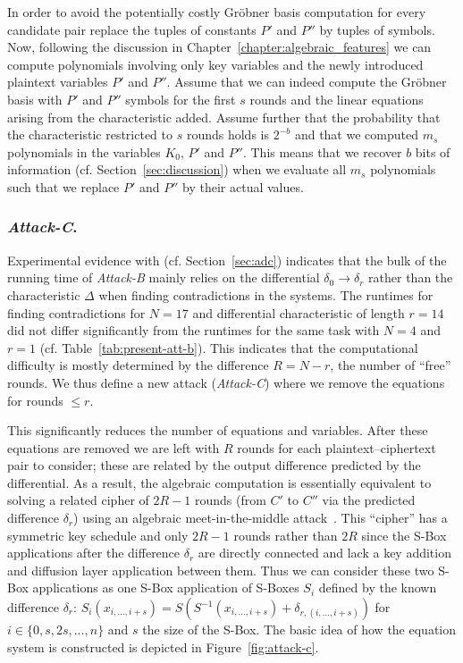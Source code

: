 In order to avoid the potentially costly Gröbner basis computation for every candidate pair replace the tuples of constants $P'$ and $P''$ by tuples of symbols. Now, following the discussion in Chapter~\ref{chapter:algebraic_features} we can compute polynomials involving only key variables and the newly introduced plaintext variables $P'$ and $P''$. Assume that we can indeed compute the Gröbner basis with $P'$ and $P''$ symbols for the first $s$ rounds and the linear equations arising from the characteristic added. Assume further that the probability that the characteristic restricted to $s$ rounds holds is $2^{-b}$ and that we computed $m_s$ polynomials in the variables $K_0$, $P'$ and $P''$. This means that we recover $b$ bits of information (cf. Section~\ref{sec:discussion}) when we evaluate all $m_s$ polynomials such that we replace $P'$ and $P''$ by their actual values.

\subsubsection{\emph{Attack-C}.}

Experimental evidence with \PRESENT (cf. Section~\ref{sec:adc}) indicates that the bulk of the running time of \emph{Attack-B} mainly relies on the differential $\delta_0 \rightarrow \delta_r$ rather than the characteristic $\Delta$ when finding contradictions in the systems. The runtimes for finding contradictions for $N=17$ and differential characteristic of length $r=14$ did not differ significantly from the runtimes for the same task with $N=4$ and $r=1$ (cf. Table~\ref{tab:present-att-b}). This indicates that the computational difficulty is mostly determined by the difference $R = N-r$, the number of ``free'' rounds. We thus define a new attack (\emph{Attack-C}) where we remove the equations for rounds $\leq r$. 

This significantly reduces the number of equations and variables. After these equations are removed we are left with $R$ rounds for each plaintext--ciphertext pair to consider; these are related  by the output difference predicted by the differential. As a result, the algebraic computation is essentially equivalent to solving a related cipher of $2R-1$ rounds (from $C'$ to $C''$ via the predicted difference $\delta_r$) using an algebraic meet-in-the-middle attack~\cite{alg-aes-book}. This ``cipher'' has a symmetric key schedule and only $2R-1$ rounds rather than $2R$ since the S-Box applications after the difference $\delta_r$ are directly connected and lack a key addition and diffusion layer application between them. Thus we can consider these two S-Box applications as one S-Box application of S-Boxes $S_{i}$ defined by the  known difference $\delta_r$: $S_{i}(x_{i,\dots,i+s}) = S(S^{-1}(x_{i,\dots,i+s}) + \delta_{r,(i,\dots,i+s)})$ for $i \in \{0,s,2s,\dots,n\}$ and $s$ the size of the S-Box. The basic idea of how the equation system is constructed is depicted in Figure~\ref{fig:attack-c}.

